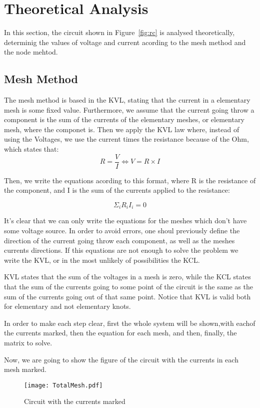 \section{Theoretical Analysis}
\label{sec:analysis}

In this section, the circuit shown in Figure~\ref{fig:rc} is analysed theoretically, determinig the values of voltage and current acording to the mesh method and the node mehtod.

\subsection{Mesh Method}

The mesh method is based in the KVL, stating that the current in a elementary mesh is some fixed value. Furthermore, we assume that the current going throw a component is the sum of the currents of the elementary meshes, or  elementary mesh, where the componet is. Then we apply the KVL law where, instead of using the Voltages, we use the current times the resistance because of the Ohm, which states that: 
\begin{equation}
  R=\frac{V}{I} \Leftrightarrow V=R \times I
  \label{eq:kvl}
\end{equation}

Then, we write the equations acording to this format, where R is the resistance of the component, and I is the sum of the currents applied to the resistance:

\begin{equation}
  \Sigma_iR_iI_i=0
  \label{eq:kvl}
\end{equation}

It's clear that we can only write the equations for the meshes which don't have some voltage source. In order to avoid errors, one shoul previously define the direction of the current going throw each component, as well as the meshes currents directions. If this equations are not enough to solve the problem we write the KVL, or in the most unlikely of possibilities the KCL.
\par
KVL states that the sum of the voltages in a mesh is zero, while the KCL states that the sum of the currents going to some point of the circuit is the same as the sum of the currents going out of that same point. Notice that KVL is valid both for elementary and not elementary knots.
\par
In order to make each step clear, first the whole system will be shown,with eachof the currents marked, then the equation for each mesh, and then, finally, the matrix to solve.
\par
Now, we are going to show the figure of the circuit with the currents in each mesh marked.
\begin{figure}[H] \centering
\texttt{[image: TotalMesh.pdf]}
\caption{Circuit with the currents marked}
\label{TotalMesh}
\end{figure}

